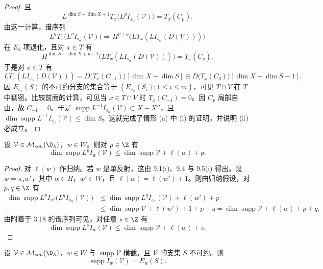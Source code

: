 \begin{proof}
且
$$L^{\dim S-\dim X+1}T_x\bigl(L^pI_{s_\alpha}(\mathcal{V})\bigr)=T_x(C_p).$$
由这一计算，谱序列
$$L^qT_x\bigl(L^pI_{s_\alpha}(\mathcal{V})\bigr)\Longrightarrow H^{p+q}\bigl(LT_x(LI_{s_\alpha}(D(\mathcal{V})))\bigr)$$
在 $E_2$ 项退化，且对 $x\in T$ 有
$$H^{\dim S-\dim X+p+1}\bigl(LT_x(LI_{s_\alpha}(D(\mathcal{V}))))=T_x(C_p).$$
于是对 $x\in T$ 有
{\small
$$LT_x(LI_{s_\alpha}(D(\mathcal{V})))=D\bigl(T_x(C_{-1})\bigr)[\dim X-\dim S]\oplus D\bigl(T_x(C_0)\bigr)[\dim X-\dim S-1].$$}
因 $E_{s_\alpha}(S)$ 的不可约分支的集合等于 $(E_{s_\alpha}(S_i);1\le i\le m)$，可见 $T\cap V$ 在 $T$ 中稠密。比较前面的计算，可见当 $x\in T\cap V$ 时 $T_x(C_{-1})=0$。因 $C_p$ 局部自由，故 $C_{-1}=0$。于是 $\operatorname{supp}L^{-1}I_{s_\alpha}(\mathcal{V})\subset X-X''$，且 $\dim\operatorname{supp}L^{-1}I_{s_\alpha}(\mathcal{V})\le\dim S$。这就完成了情形 (a) 中 (i) 的证明，并说明 (ii) 必成立。
\end{proof}

\begin{proposition}\label{prop:03.9.6}
设 $\mathcal{V}\in\mathcal{M}_{coh}(\D_\lambda)$，$w\in W$。则对 $p\in\Z$ 有
$$\dim\operatorname{supp}L^pI_w(\mathcal{V})\le\dim\operatorname{supp}\mathcal{V}+\ell(w)+p.$$
\end{proposition}

\begin{proof}
对 $\ell(w)$ 作归纳。若 $w$ 是单反射，这由 9.1(i)、9.4 与 9.5(i) 得出。设 $w=s_\alpha w'$，其中 $\alpha\in\Pi$，$w'\in W$，且 $\ell(w)=\ell(w')+1$。则由归纳假设，对 $p,q\in\Z$ 有
{\small
\begin{align*}
\dim\operatorname{supp}L^pI_{w'}\bigl(L^qI_{s_\alpha}(\mathcal{V})\bigr)&\le\dim\operatorname{supp}L^qI_{s_\alpha}(\mathcal{V})+\ell(w')+p\\
&\le\dim\operatorname{supp}\mathcal{V}+\ell(w')+1+p+q=\dim\operatorname{supp}\mathcal{V}+\ell(w)+p+q.
\end{align*}}
由附着于 3.18 的谱序列可见，对任意 $s\in\Z$ 有
$$\dim\operatorname{supp}L^sI_w(\mathcal{V})\le\dim\operatorname{supp}\mathcal{V}+\ell(w)+s.$$
\end{proof}

\begin{lemma}\label{lem:03.9.7}
设 $\mathcal{V}\in\mathcal{M}_{coh}(\D_\lambda)$，$w\in W$ 与 $\operatorname{supp}\mathcal{V}$ 横截，且 $\mathcal{V}$ 的支集 $S$ 不可约。则
$$\operatorname{supp}I_w(\mathcal{V})=E_w(S).$$
\end{lemma}

